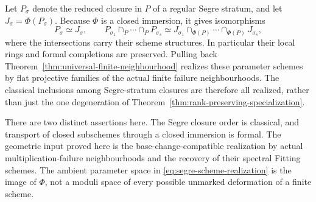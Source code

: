 Let \(P_\sigma\) denote the reduced closure in \(P\) of a
regular Segre stratum, and let \(J_\sigma=\Phi(P_\sigma)\).
Because \(\Phi\) is a closed immersion, it gives isomorphisms
\begin{equation}\label{eq:segre-scheme-realization}
 P_\sigma\simeq J_\sigma,
 \qquad
 P_{\sigma_1}\cap_P\cdots\cap_P P_{\sigma_s}
 \simeq
 J_{\sigma_1}\cap_{\Phi(P)}\cdots\cap_{\Phi(P)}J_{\sigma_s},
\end{equation}
where the intersections carry their scheme structures.  In
particular their local rings and formal completions are preserved.
Pulling back Theorem~\ref{thm:universal-finite-neighbourhood} realizes
these parameter schemes by flat projective families of the actual
finite failure neighbourhoods.  The classical inclusions among
Segre-stratum closures \cite[Theorem~5.1]{FevolaMandelshtamSturmfels}
are therefore all realized, rather than just the one degeneration
of Theorem~\ref{thm:rank-preserving-specialization}.

There are two distinct assertions here.  The Segre closure order is
classical, and transport of closed subschemes through a closed
immersion is formal.  The geometric input proved here is the
base-change-compatible realization by actual multiplication-failure
neighbourhoods and the recovery of their spectral Fitting schemes.
The ambient parameter space in \eqref{eq:segre-scheme-realization}
is the image of \(\Phi\), not a moduli space of every possible
unmarked deformation of a finite scheme.
